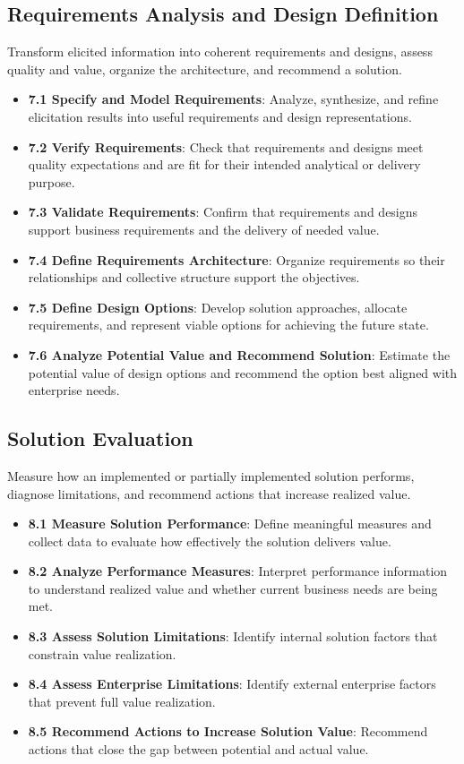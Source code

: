 \documentclass[11pt]{article}
\begin{document}
\subsection{Requirements Analysis and Design Definition}
Transform elicited information into coherent requirements and designs, assess quality and value, organize the architecture, and recommend a solution.
\begin{itemize}
\item \textbf{7.1 Specify and Model Requirements}: Analyze, synthesize, and refine elicitation results into useful requirements and design representations.
\item \textbf{7.2 Verify Requirements}: Check that requirements and designs meet quality expectations and are fit for their intended analytical or delivery purpose.
\item \textbf{7.3 Validate Requirements}: Confirm that requirements and designs support business requirements and the delivery of needed value.
\item \textbf{7.4 Define Requirements Architecture}: Organize requirements so their relationships and collective structure support the objectives.
\item \textbf{7.5 Define Design Options}: Develop solution approaches, allocate requirements, and represent viable options for achieving the future state.
\item \textbf{7.6 Analyze Potential Value and Recommend Solution}: Estimate the potential value of design options and recommend the option best aligned with enterprise needs.
\end{itemize}
\subsection{Solution Evaluation}
Measure how an implemented or partially implemented solution performs, diagnose limitations, and recommend actions that increase realized value.
\begin{itemize}
\item \textbf{8.1 Measure Solution Performance}: Define meaningful measures and collect data to evaluate how effectively the solution delivers value.
\item \textbf{8.2 Analyze Performance Measures}: Interpret performance information to understand realized value and whether current business needs are being met.
\item \textbf{8.3 Assess Solution Limitations}: Identify internal solution factors that constrain value realization.
\item \textbf{8.4 Assess Enterprise Limitations}: Identify external enterprise factors that prevent full value realization.
\item \textbf{8.5 Recommend Actions to Increase Solution Value}: Recommend actions that close the gap between potential and actual value.
\end{itemize}
\end{document}
